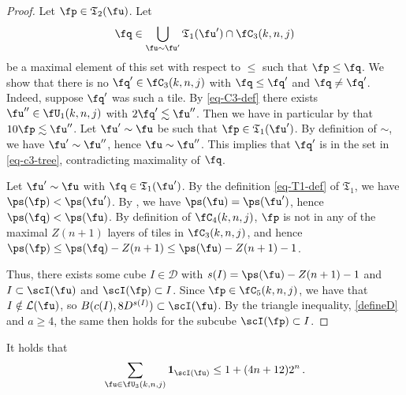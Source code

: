 \begin{proof}
    Let $\fp \in \mathfrak{T}_2(\fu)$. Let
    \begin{equation}
        \label{eq-c3-tree}
        \fq \in \bigcup_{\fu \sim \fu'} \mathfrak{T}_1(\fu') \cap \fC_3(k,n,j)
    \end{equation}
    be a maximal element of this set with respect to $\le$ such that $\fp \le \fq$.
    We show that there is no $\fq' \in \fC_3(k,n,j)$ with $\fq \le \fq'$ and $\fq \ne \fq'$. Indeed, suppose $\fq'$ was such a tile.
    By \eqref{eq-C3-def} there exists $\fu'' \in \fU_1(k,n,j)$ with $2\fq' \lesssim \fu''$. Then we have in particular by  that $10 \fp \lesssim \fu''$. Let $\fu' \sim \fu$ be such that $\fp \in \mathfrak{T}_1(\fu')$. By definition of $\sim$, we have $\fu' \sim \fu''$, hence $\fu \sim \fu''$. This implies that $\fq'$ is in the set in \eqref{eq-c3-tree}, contradicting maximality of $\fq$.

    Let $\fu' \sim \fu$ with $\fq \in \mathfrak{T}_1(\fu')$. By the definition \eqref{eq-T1-def} of $\mathfrak{T}_1$, we have $\ps(\fp) < \ps(\fu')$. By , we have $\ps(\fu) = \ps(\fu')$, hence $\ps(\fq) < \ps(\fu)$. By definition of $\fC_4(k,n,j)$, $\fp$ is not in any of the maximal $Z(n+1)$ layers of tiles in $\fC_3(k,n,j)$, and hence $\ps(\fp) \le \ps(\fq) - Z(n+1) \le \ps(\fu) - Z(n+1) - 1$.

    Thus, there exists some cube $I \in \mathcal{D}$ with $s(I) = \ps(\fu) - Z(n+1) - 1$ and $I \subset \scI(\fu)$ and $\scI(\fp) \subset I$. Since $\fp \in \fC_5(k,n,j)$, we have that $I \notin \mathcal{L}(\fu)$, so $B(c(I), 8D^{s(I)}) \subset \scI(\fu)$. By the triangle inequality, \eqref{defineD} and $a \ge 4$, the same then holds for the subcube $\scI(\fp) \subset I$.
\end{proof}


\begin{lemma}
    \label{forest-stacking}
    \leanok
    It holds that
    \begin{equation}
        \sum_{\fu \in \fU_3(k,n,j)} \mathbf{1}_{\scI(\fu)} \le 1 + (4n+12)2^{n}\,.
    \end{equation}
\end{lemma}

